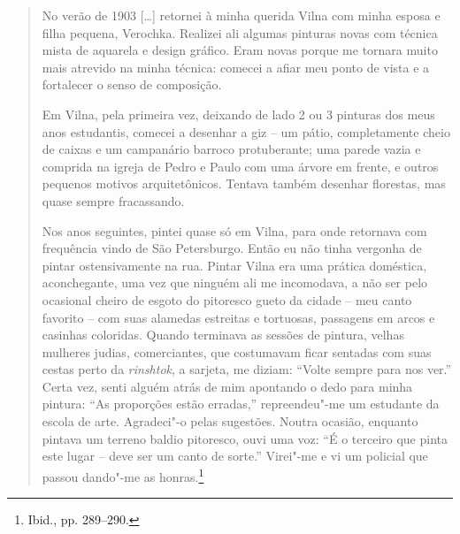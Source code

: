 \begin{quote}
No verão de 1903 [\ldots{}] retornei à minha querida Vilna com minha
esposa e filha pequena, Verochka. Realizei ali algumas pinturas novas
com técnica mista de aquarela e design gráfico. Eram novas porque me
tornara muito mais atrevido na minha técnica: comecei a afiar meu ponto
de vista e a fortalecer o senso de composição.

Em Vilna, pela primeira vez, deixando de lado 2 ou 3 pinturas dos meus
anos estudantis, comecei a desenhar a giz -- um pátio, completamente
cheio de caixas e um campanário barroco protuberante; uma parede vazia e
comprida na igreja de Pedro e Paulo com uma árvore em frente, e outros
pequenos motivos arquitetônicos. Tentava também desenhar florestas, mas
quase sempre fracassando.

Nos anos seguintes, pintei quase só em Vilna, para onde retornava com
frequência vindo de São Petersburgo. Então eu não tinha vergonha de
pintar ostensivamente na rua. Pintar Vilna era uma prática doméstica,
aconchegante, uma vez que ninguém ali me incomodava, a não ser pelo
ocasional cheiro de esgoto do pitoresco gueto da cidade -- meu canto
favorito -- com suas alamedas estreitas e tortuosas, passagens em arcos e
casinhas coloridas. Quando terminava as sessões de pintura, velhas
mulheres judias, comerciantes, que costumavam ficar sentadas com suas
cestas perto da \textit{rinshtok}, a sarjeta, me diziam: ``Volte sempre
para nos ver.'' Certa vez, senti alguém atrás de mim apontando o dedo
para minha pintura: ``As proporções estão erradas,'' repreendeu"-me um
estudante da escola de arte. Agradeci"-o pelas sugestões. Noutra ocasião,
enquanto pintava um terreno baldio pitoresco, ouvi uma voz: ``É o
terceiro que pinta este lugar -- deve ser um canto de sorte.'' Virei"-me e
vi um policial que passou dando"-me as honras.\footnote{Ibid., pp. 289--290.} 
\end{quote}

